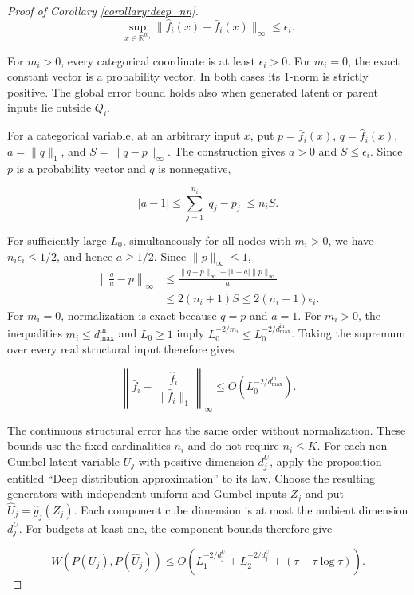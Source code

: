 \begin{proof}[Proof of Corollary \ref{corollary:deep_nn}]
\[
\sup_{x\in\mathbb R^{m_i}}\|\hat f_i(x)-\bar f_i(x)\|_\infty\leqslant\epsilon_i.
\]

For $m_i>0$, every categorical coordinate is at least $\epsilon_i>0$. For $m_i=0$, the exact constant vector is a probability vector. In both cases its $1$-norm is strictly positive. The global error bound holds also when generated latent or parent inputs lie outside $Q_i$. 

For a categorical variable, at an arbitrary input $x$, put $p=\bar f_i(x)$, $q=\hat f_i(x)$, $a=\|q\|_1$, and $S=\|q-p\|_\infty$. The construction gives $a>0$ and $S\leqslant\epsilon_i$. Since $p$ is a probability vector and $q$ is nonnegative,

\[
|a-1|\leqslant\sum_{j=1}^{n_i}|q_j-p_j|\leqslant n_iS.
\]

For sufficiently large $L_0$, simultaneously for all nodes with $m_i>0$, we have $n_i\epsilon_i\leqslant1/2$, and hence $a\geqslant1/2$. Since $\|p\|_\infty\leqslant1$,
\begin{align*}
\left\|\frac q a-p\right\|_\infty
&\leqslant\frac{\|q-p\|_\infty+|1-a|\|p\|_\infty}{a}\\
&\leqslant2(n_i+1)S\leqslant2(n_i+1)\epsilon_i.
\end{align*}
For $m_i=0$, normalization is exact because $q=p$ and $a=1$. For $m_i>0$, the inequalities $m_i\leqslant d_{\max}^{\text{in}}$ and $L_0\geqslant1$ imply $L_0^{-2/m_i}\leqslant L_0^{-2/d_{\max}^{\text{in}}}$. Taking the supremum over every real structural input therefore gives

\[
\left\|\bar f_i-\frac{\hat f_i}{\|\hat f_i\|_1}\right\|_\infty\leqslant O(L_0^{-2/d_{\max}^{\text{in}}}).
\]

The continuous structural error has the same order without normalization. These bounds use the fixed cardinalities $n_i$ and do not require $n_i\leqslant K$.
For each non-Gumbel latent variable $U_j$ with positive dimension $d_j^U$, apply the proposition entitled ``Deep distribution approximation'' to its law. Choose the resulting generators with independent uniform and Gumbel inputs $Z_j$ and put $\hat U_j=\hat g_j(Z_j)$. Each component cube dimension is at most the ambient dimension $d_j^U$. For budgets at least one, the component bounds therefore give

\[
W(P(U_j),P(\hat U_j))\leqslant O\left(L_1^{-2/d_j^U}+L_2^{-2/d_j^U}+(\tau-\tau\log\tau)\right).
\]


\end{proof}
